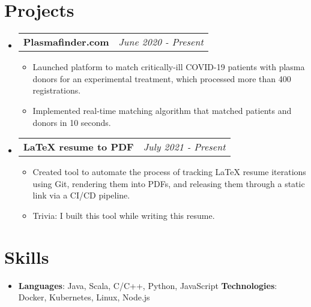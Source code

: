 \documentclass[letterpaper,11pt]{article}
\makeatletter
\newcommand{\resumeItemWithoutBold}[1]{
  \item\small{
    {#1 \vspace{-2pt}}
  }
}
\newcommand{\projectSubheading}[2]{
  \vspace{-1pt}\item
    \begin{tabular*}{0.97\textwidth}{l@{\extracolsep{\fill}}r}
      \textbf{#1} & \textit{\small #2}
    \end{tabular*}\vspace{-5pt}
}
\newcommand{\resumeSubHeadingListStart}{\begin{itemize}[leftmargin=*]}
\newcommand{\resumeSubHeadingListEnd}{\end{itemize}}
\newcommand{\resumeItemListStart}{\begin{itemize}}
\newcommand{\resumeItemListEnd}{\end{itemize}\vspace{-5pt}}
\makeatother
\begin{document}
\section{Projects}
  \resumeSubHeadingListStart
    \projectSubheading
        {Plasmafinder.com}{June 2020 - Present}
        \resumeItemListStart
            \resumeItemWithoutBold
            {
                Launched platform to match critically-ill COVID-19 patients with plasma donors for an experimental treatment, which processed more than 400 registrations. \href{https://github.com/TakshPSingh/plasmafinder.com}{\color{blue}{(link to repository)}}
            }
            \resumeItemWithoutBold
            {
                Implemented real-time matching algorithm that matched patients and donors in 10 seconds.
            }
        \resumeItemListEnd
    \projectSubheading
        {LaTeX resume to PDF}{July 2021 - Present}
        \resumeItemListStart
            \resumeItemWithoutBold
            {
                Created tool to automate the process of tracking LaTeX resume iterations using Git, rendering them into PDFs, and releasing them through a static link via a CI/CD pipeline. \href{https://github.com/TakshPSingh/latex-resume-to-pdf}{\color{blue}{(link to repository)}}
            }
            \resumeItemWithoutBold
            {
                Trivia: I built this tool while writing this resume.
            }
        \resumeItemListEnd
  \resumeSubHeadingListEnd

%
\section{Skills}
 \resumeSubHeadingListStart
   \item{
     \textbf{Languages}{: Java, Scala, C/C++, Python, JavaScript}
     \hfill
     \textbf{Technologies}{: Docker, Kubernetes, Linux, Node.js}
   }
 \resumeSubHeadingListEnd


\end{document}
